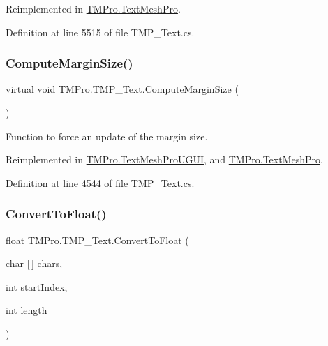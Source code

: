 Reimplemented in \mbox{\hyperlink{class_t_m_pro_1_1_text_mesh_pro_a7b6baf8afa783ff9a77d62fffe4073a6}{T\+M\+Pro.\+Text\+Mesh\+Pro}}.



Definition at line 5515 of file T\+M\+P\+\_\+\+Text.\+cs.

\mbox{\label{class_t_m_pro_1_1_t_m_p___text_a9e380bad2a5506d96b7c1d3b0b12d013}} 
\subsubsection{\texorpdfstring{ComputeMarginSize()}{ComputeMarginSize()}}
{\footnotesize\ttfamily virtual void T\+M\+Pro.\+T\+M\+P\+\_\+\+Text.\+Compute\+Margin\+Size (\begin{DoxyParamCaption}{ }\end{DoxyParamCaption})\hspace{0.3cm}{\ttfamily [virtual]}}



Function to force an update of the margin size. 



Reimplemented in \mbox{\hyperlink{class_t_m_pro_1_1_text_mesh_pro_u_g_u_i_a585823ae58e0b54f1497ced737567a03}{T\+M\+Pro.\+Text\+Mesh\+Pro\+U\+G\+UI}}, and \mbox{\hyperlink{class_t_m_pro_1_1_text_mesh_pro_af98c43be93b6f588b2086aff6957197e}{T\+M\+Pro.\+Text\+Mesh\+Pro}}.



Definition at line 4544 of file T\+M\+P\+\_\+\+Text.\+cs.

\mbox{\label{class_t_m_pro_1_1_t_m_p___text_a939a6f39042a1079067970d796eeee6f}} 
\subsubsection{\texorpdfstring{ConvertToFloat()}{ConvertToFloat()}\hspace{0.1cm}{\footnotesize\ttfamily [1/2]}}
{\footnotesize\ttfamily float T\+M\+Pro.\+T\+M\+P\+\_\+\+Text.\+Convert\+To\+Float (\begin{DoxyParamCaption}\item[{char \mbox{[}$\,$\mbox{]}}]{chars,  }\item[{int}]{start\+Index,  }\item[{int}]{length }\end{DoxyParamCaption})\hspace{0.3cm}{\ttfamily [protected]}}



